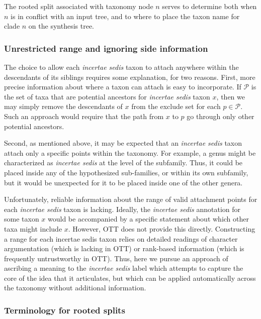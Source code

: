 \documentclass[english]{article}
\begin{document}
The rooted split associated with taxonomy node $n$ serves to determine both when $n$ is in conflict
with an input tree, and to where to place the taxon name for clade $n$ on the synthesis tree.

\subsubsection{Unrestricted range and ignoring side information}
The choice to allow each \emph{incertae sedis} taxon to attach anywhere within
the descendants of its siblings requires some explanation, for two reasons.
First, more precise information about where a taxon can attach is easy to
incorporate. If $\mathcal{P}$ is the set of taxa that are potential ancestors for \emph{incertae
sedis} taxon $x$, then we may simply remove the descendants of $x$ from the exclude
set for each $p\in\mathcal{P}$.  Such an approach would require that the path from $x$ to $p$
go through only other potential ancestors.

Second, as mentioned above, it may be expected that an \emph{incertae sedis} taxon
attach only a specific points within the taxonomy. For example, a genus
might be characterized as \emph{incertae sedis} at the level of the subfamily.
Thus, it could be placed inside any of the hypothesized sub-families, or within
its own subfamily, but it would be unexpected for it to be placed inside one of
the other genera.

Unfortunately, reliable information about the range of valid attachment points
for each \emph{incertae sedis} taxon is lacking.  Ideally, the \emph{incertae
  sedis} annotation for some taxon $x$ would be accompanied by a specific statement
about which other taxa might include $x$.  However, OTT does not provide this
directly.  Constructing a range for each incertae sedis taxon relies on detailed
readings of character argumentation (which is lacking in OTT) or rank-based
information (which is frequently untrustworthy in OTT). Thus, here we pursue
an approach of ascribing a meaning to the \emph{incertae sedis} label which
attempts to capture the core of the idea that it articulates, but which can be
applied automatically across the taxonomy without additional information.

\subsubsection{Terminology for rooted splits}
\end{document}
